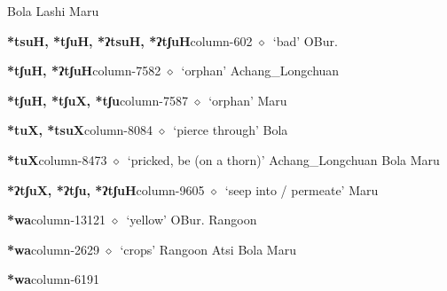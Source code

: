          Bola 
\hspace{1ex}
         Lashi 
\hspace{1ex}
         Maru 
  \item {\footnotesize \textbf{*tsuH, *tʃuH, *ʔtsuH, *ʔtʃuH}}{\tiny column-602}
         $\diamond$~`bad'
         OBur. 
  \item {\footnotesize \textbf{*tʃuH, *ʔtʃuH}}{\tiny column-7582}
         $\diamond$~`orphan'
         Achang\_Longchuan 
  \item {\footnotesize \textbf{*tʃuH, *tʃuX, *tʃu}}{\tiny column-7587}
         $\diamond$~`orphan'
         Maru 
  \item {\footnotesize \textbf{*tuX, *tsuX}}{\tiny column-8084}
         $\diamond$~`pierce through'
         Bola 
  \item {\footnotesize \textbf{*tuX}}{\tiny column-8473}
         $\diamond$~`pricked, be (on a thorn)'
         Achang\_Longchuan 
\hspace{1ex}
         Bola 
\hspace{1ex}
         Maru 
  \item {\footnotesize \textbf{*ʔtʃuX, *ʔtʃu, *ʔtʃuH}}{\tiny column-9605}
         $\diamond$~`seep into / permeate'
         Maru 
  \item {\footnotesize \textbf{*wa}}{\tiny column-13121}
         $\diamond$~`yellow'
         OBur. 
\hspace{1ex}
         Rangoon 
  \item {\footnotesize \textbf{*wa}}{\tiny column-2629}
         $\diamond$~`crops'
         Rangoon 
\hspace{1ex}
         Atsi 
\hspace{1ex}
         Bola 
\hspace{1ex}
         Maru 
  \item {\footnotesize \textbf{*wa}}{\tiny column-6191}
